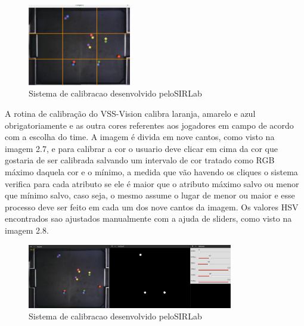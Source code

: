 \begin{figure}[!h]
	\centering
	\includegraphics[width=0.4\textwidth]{vssvision.pdf} 	
	\caption{Sistema de calibracao desenvolvido peloSIRLab \cite{Rosa:2015}}
	\label{SIRLabCalibracao}
\end{figure}
A rotina de calibração do VSS-Vision calibra laranja, amarelo e azul obrigatoriamente e as outra cores referentes aos jogadores em campo\cite{Rosa:2015} de acordo com a escolha do time. A imagem é divida em nove cantos, como visto na imagem 2.7, e para calibrar a cor o usuario deve clicar em cima da cor que gostaria de ser calibrada salvando um intervalo de cor tratado como RGB máximo daquela cor e o mínimo, a medida
que vão havendo os cliques o sistema verifica para cada atributo se ele é maior que o atributo
máximo salvo ou menor que mínimo salvo, caso seja, o mesmo assume o lugar de menor ou
maior\cite{Rosa:2015} e esse processo deve ser feito em cada um dos nove cantos da imagem. Os valores HSV encontrados sao ajustados manualmente com a ajuda de sliders, como visto na imagem 2.8.
\begin{figure}[!h]
	\centering
	\includegraphics[width=0.8\textwidth]{calibration.pdf} 	
	\caption{Sistema de calibracao desenvolvido peloSIRLab \cite{VSSVision}}
	\label{SIRLabCalibracaoHSV}
\end{figure}
